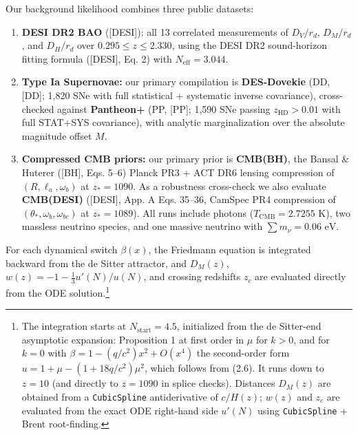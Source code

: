 \documentclass[11pt,a4paper]{article}
\begin{document}
Our background likelihood combines three public datasets:

\begin{enumerate}
\item{} {\bfseries\boldmath DESI DR2 BAO} ([DESI]): all 13 correlated measurements of $D_V/r_d$, $D_M/r_d$, and $D_H/r_d$ over $0.295 \le z \le 2.330$, using the DESI DR2 sound-horizon fitting formula ([DESI], Eq. 2) with $N_{\text{eff}} = 3.044$.
\item{} {\bfseries\boldmath Type Ia Supernovae:} our primary compilation is {\bfseries\boldmath DES-Dovekie} (DD, [DD]; 1,820 SNe with full statistical + systematic inverse covariance), cross-checked against {\bfseries\boldmath Pantheon+} (PP, [PP]; 1,590 SNe passing $z_{\text{HD}} > 0.01$ with full STAT+SYS covariance), with analytic marginalization over the absolute magnitude offset $M$.
\item{} {\bfseries\boldmath Compressed CMB priors:} our primary prior is {\bfseries\boldmath CMB(BH)}, the Bansal \& Huterer ([BH], Eqs. 5--6) Planck PR3 + ACT DR6 lensing compression of $(R, \ell_a, \omega_b)$ at $z_* = 1090$. As a robustness cross-check we also evaluate {\bfseries\boldmath CMB(DESI)} ([DESI], App. A Eqs. 35--36, CamSpec PR4 compression of $(\theta_*, \omega_b, \omega_{bc})$ at $z_* = 1089$). All runs include photons ($T_{\text{CMB}} = 2.7255\text{ K}$), two massless neutrino species, and one massive neutrino with $\sum m_\nu = 0.06\text{ eV}$.
\end{enumerate}

For each dynamical switch $\beta(x)$, the Friedmann equation is integrated backward from the de Sitter attractor, and $D_M(z)$, $w(z) = -1 - \frac{1}{3}u'(N)/u(N)$, and crossing redshifts $z_c$ are evaluated directly from the ODE solution.\footnote{The integration starts at $N_{\text{start}} = 4.5$, initialized from the de Sitter-end asymptotic expansion: Proposition 1 at first order in $\mu$ for $k > 0$, and for $k = 0$ with $\beta = 1 - (q/c^2)x^2 + O(x^4)$ the second-order form $u = 1 + \mu - (1 + 18q/c^2)\mu^2$, which follows from (2.6). It runs down to $z = 10$ (and directly to $z = 1090$ in splice checks). Distances $D_M(z)$ are obtained from a \texttt{CubicSpline} antiderivative of $c/H(z)$; $w(z)$ and $z_c$ are evaluated from the exact ODE right-hand side $u'(N)$ using \texttt{CubicSpline} + Brent root-finding.}
\end{document}
